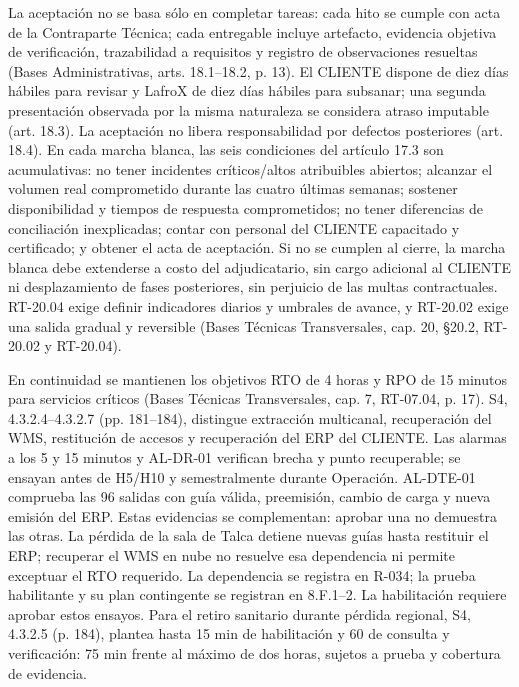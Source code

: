 La aceptación no se basa sólo en completar tareas: cada hito se cumple con acta de la Contraparte Técnica; cada entregable incluye artefacto, evidencia objetiva de verificación, trazabilidad a requisitos y registro de observaciones resueltas (Bases Administrativas, arts. 18.1--18.2, p. 13). El CLIENTE dispone de diez días hábiles para revisar y LafroX de diez días hábiles para subsanar; una segunda presentación observada por la misma naturaleza se considera atraso imputable (art. 18.3). La aceptación no libera responsabilidad por defectos posteriores (art. 18.4). En cada marcha blanca, las seis condiciones del artículo 17.3 son acumulativas: no tener incidentes críticos/altos atribuibles abiertos; alcanzar el volumen real comprometido durante las cuatro últimas semanas; sostener disponibilidad y tiempos de respuesta comprometidos; no tener diferencias de conciliación inexplicadas; contar con personal del CLIENTE capacitado y certificado; y obtener el acta de aceptación. Si no se cumplen al cierre, la marcha blanca debe extenderse a costo del adjudicatario, sin cargo adicional al CLIENTE ni desplazamiento de fases posteriores, sin perjuicio de las multas contractuales. RT-20.04 exige definir indicadores diarios y umbrales de avance, y RT-20.02 exige una salida gradual y reversible (Bases Técnicas Transversales, cap. 20, §20.2, RT-20.02 y RT-20.04).

En continuidad se mantienen los objetivos RTO de 4 horas y RPO de 15 minutos para servicios críticos (Bases Técnicas Transversales, cap. 7, RT-07.04, p. 17). S4, 4.3.2.4--4.3.2.7 (pp. 181--184), distingue extracción multicanal, recuperación del WMS, restitución de accesos y recuperación del ERP del CLIENTE. Las alarmas a los 5 y 15 minutos y AL-DR-01 verifican brecha y punto recuperable; se ensayan antes de H5/H10 y semestralmente durante Operación. AL-DTE-01 comprueba las 96 salidas con guía válida, preemisión, cambio de carga y nueva emisión del ERP. Estas evidencias se complementan: aprobar una no demuestra las otras. La pérdida de la sala de Talca detiene nuevas guías hasta restituir el ERP; recuperar el WMS en nube no resuelve esa dependencia ni permite exceptuar el RTO requerido. La dependencia se registra en R-034; la prueba habilitante y su plan contingente se registran en 8.F.1--2. La habilitación requiere aprobar estos ensayos. Para el retiro sanitario durante pérdida regional, S4, 4.3.2.5 (p. 184), plantea hasta 15 min de habilitación y 60 de consulta y verificación: 75 min frente al máximo de dos horas, sujetos a prueba y cobertura de evidencia.

